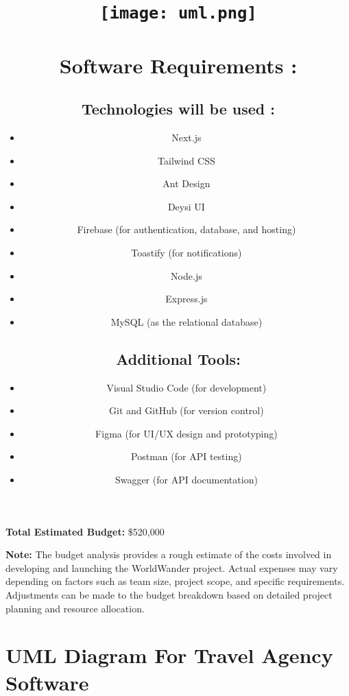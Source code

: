 \documentclass[12pt]{article}
\begin{document}
\noindent\textbf{Total Estimated Budget:} \$520,000

\noindent\textbf{Note:} The budget analysis provides a rough estimate of the costs involved in developing and launching the WorldWander project. Actual expenses may vary depending on factors such as team size, project scope, and specific requirements. Adjustments can be made to the budget breakdown based on detailed project planning and resource allocation.


\section * {UML Diagram For Travel Agency Software}
\title{
{\texttt{[image: uml.png]}}

\section * {Software Requirements : }
\subsection*{Technologies will be used :}
\begin{itemize}
    \item Next.js
    \item Tailwind CSS
    \item Ant Design
    \item Deysi UI
    \item Firebase (for authentication, database, and hosting)
    \item Toastify (for notifications)
    \item Node.js
    \item Express.js
    \item MySQL (as the relational database)
\end{itemize}
  
\subsection*{Additional Tools:}
\begin{itemize}
    \item Visual Studio Code (for development)
    \item Git and GitHub (for version control)
    \item Figma (for UI/UX design and prototyping)
    \item Postman (for API testing)
    \item Swagger (for API documentation)
\end{itemize}

}
\end{document}
